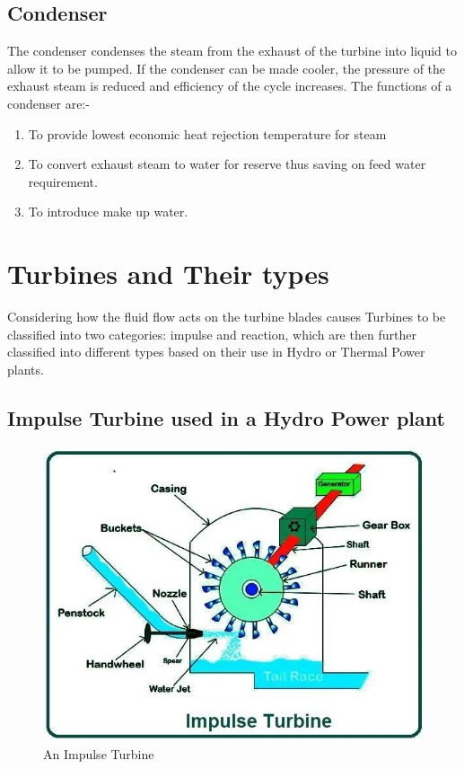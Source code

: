 \documentclass[11pt]{article}
\begin{document}
\subsection{Condenser}
The condenser condenses the steam from the exhaust of the turbine into liquid to
allow it to be pumped. If the condenser can be made cooler, the pressure of the exhaust steam
is reduced and efficiency of the cycle increases. The functions of a condenser are:-


\begin{enumerate}
	\item To provide lowest economic heat rejection temperature for steam
	\item To convert exhaust steam to water for reserve thus saving on feed water requirement.
	\item To introduce make up water.
\end{enumerate}


\section{Turbines and Their types}

Considering how the fluid flow acts on the turbine blades causes Turbines to be classified into two categories: impulse and reaction, which are then further classified into different types based on their use in Hydro or Thermal Power plants. 

\subsection{Impulse Turbine used in a Hydro Power plant}
\begin{figure}[H]
	\centering
	\includegraphics[scale=0.6]{impulse turbine.jpg}
	\caption{An Impulse Turbine}
	\label{it}
\end{figure}
\end{document}
